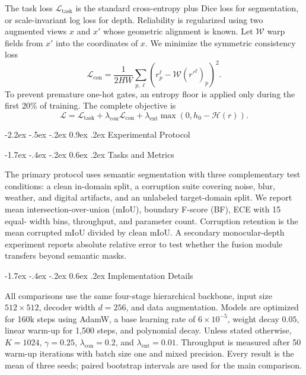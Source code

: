 \documentclass[10pt,twocolumn,letterpaper]{article}
\makeatletter
\renewcommand\section{\@startsection{section}{1}{\z@}%
  {-2.2ex \@plus -.5ex \@minus -.2ex}%
  {0.9ex \@plus .2ex}%
  {\normalfont\large\bfseries\color{iccvblue}}}
\renewcommand\subsection{\@startsection{subsection}{2}{\z@}%
  {-1.7ex \@plus -.4ex \@minus -.2ex}%
  {0.6ex \@plus .2ex}%
  {\normalfont\normalsize\bfseries}}
\makeatother
\begin{document}
The task loss $\mathcal{L}_{\mathrm{task}}$ is the standard cross-entropy plus
Dice loss for segmentation, or scale-invariant log loss for depth. Reliability
is regularized using two augmented views $x$ and $x'$ whose geometric alignment
is known. Let $\mathcal{W}$ warp fields from $x'$ into the coordinates of $x$.
We minimize the symmetric consistency loss
\begin{equation}
  \mathcal{L}_{\mathrm{con}}=
  \frac{1}{2HW}\sum_{p,\ell}
  \left(r^{\ell}_{p}-\mathcal{W}(r'^{\ell})_{p}\right)^2.
  \label{eq:consistency}
\end{equation}
To prevent premature one-hot gates, an entropy floor is applied only during the
first 20\% of training. The complete objective is
\begin{equation}
  \mathcal{L}=\mathcal{L}_{\mathrm{task}}
  +\lambda_{\mathrm{con}}\mathcal{L}_{\mathrm{con}}
  +\lambda_{\mathrm{ent}}\max(0,h_0-\mathcal{H}(r)).
  \label{eq:objective}
\end{equation}

\section{Experimental Protocol}
\label{sec:experiments}

\subsection{Tasks and Metrics}

The primary protocol uses semantic segmentation with three complementary test
conditions: a clean in-domain split, a corruption suite covering noise, blur,
weather, and digital artifacts, and an unlabeled target-domain split. We report
mean intersection-over-union (mIoU), boundary F-score (BF), ECE with 15 equal-
width bins, throughput, and parameter count. Corruption retention is the mean
corrupted mIoU divided by clean mIoU. A secondary monocular-depth experiment
reports absolute relative error to test whether the fusion module transfers
beyond semantic masks.

\subsection{Implementation Details}

All comparisons use the same four-stage hierarchical backbone, input size
$512\times512$, decoder width $d=256$, and data augmentation. Models are
optimized for 160k steps using AdamW, a base learning rate of $6\times10^{-5}$,
weight decay $0.05$, linear warm-up for 1,500 steps, and polynomial decay.
Unless stated otherwise, $K=1024$, $\gamma=0.25$,
$\lambda_{\mathrm{con}}=0.2$, and $\lambda_{\mathrm{ent}}=0.01$. Throughput is
measured after 50 warm-up iterations with batch size one and mixed precision.
Every result is the mean of three seeds; paired bootstrap intervals are used for
the main comparison.
\end{document}
